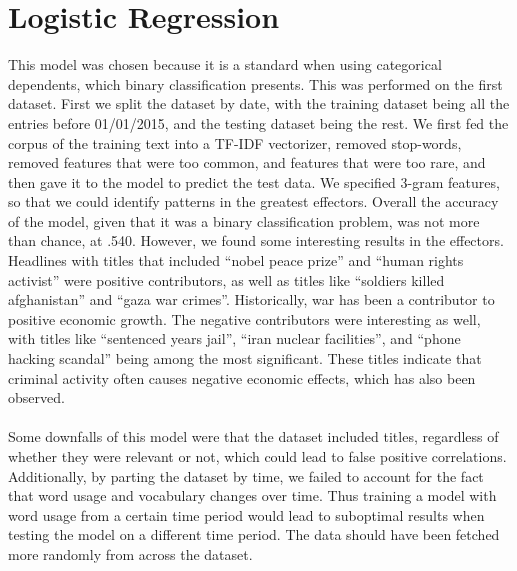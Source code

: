 \documentclass{article}
\begin{document}
\section{Logistic Regression}
This model was chosen because it is a standard when using categorical dependents, which binary classification presents.
 This was performed on the first dataset. First we split the dataset by date, with the training dataset being all the
 entries before 01/01/2015, and the testing dataset being the rest. We first fed the corpus of the training text into
 a TF-IDF vectorizer, removed stop-words, removed features that were too common, and features that were too rare, and
 then gave it to the model to predict the test data. We specified 3-gram features, so that we could identify patterns
 in the greatest effectors. Overall the accuracy of the model, given that it was a binary classification problem, was
 not more than chance, at .540. However, we found some interesting results in the effectors. Headlines with titles that
 included “nobel peace prize” and “human rights activist” were positive contributors, as well as titles like “soldiers
 killed afghanistan” and “gaza war crimes”. Historically, war has been a contributor to positive economic growth.
 The negative contributors were interesting as well,  with titles like “sentenced years jail”, “iran nuclear facilities”,
 and “phone hacking scandal” being among the most significant. These titles indicate that criminal activity often causes
 negative economic effects, which has also been observed.
\\\\
Some downfalls of this model were that the dataset included titles, regardless of whether they were relevant or not, which
 could lead to false positive correlations. Additionally, by parting the dataset by time, we failed to account for the fact
 that word usage and vocabulary changes over time. Thus training a model with word usage from a certain time period would
 lead to suboptimal results when testing the model on a different time period. The data should have been fetched more
 randomly from across the dataset.
\end{document}
